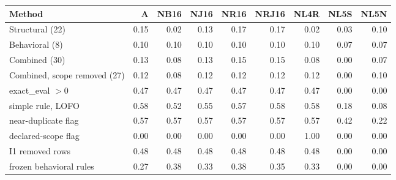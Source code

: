 \begin{tabular}{lrrrrrrrr}\toprule
Method & A & NB16 & NJ16 & NR16 & NRJ16 & NL4R & NL5S & NL5N\\\midrule
Structural (22) & 0.15 & 0.02 & 0.13 & 0.17 & 0.17 & 0.02 & 0.03 & 0.10\\
Behavioral (8) & 0.10 & 0.10 & 0.10 & 0.10 & 0.10 & 0.10 & 0.07 & 0.07\\
Combined (30) & 0.13 & 0.08 & 0.13 & 0.15 & 0.15 & 0.08 & 0.00 & 0.07\\
Combined, scope removed (27) & 0.12 & 0.08 & 0.12 & 0.12 & 0.12 & 0.12 & 0.00 & 0.10\\
exact\_eval $>0$ & 0.47 & 0.47 & 0.47 & 0.47 & 0.47 & 0.47 & 0.00 & 0.00\\
simple rule, LOFO & 0.58 & 0.52 & 0.55 & 0.57 & 0.58 & 0.58 & 0.18 & 0.08\\
near-duplicate flag & 0.57 & 0.57 & 0.57 & 0.57 & 0.57 & 0.57 & 0.42 & 0.22\\
declared-scope flag & 0.00 & 0.00 & 0.00 & 0.00 & 0.00 & 1.00 & 0.00 & 0.00\\
I1 removed rows & 0.48 & 0.48 & 0.48 & 0.48 & 0.48 & 0.48 & 0.00 & 0.00\\
frozen behavioral rules & 0.27 & 0.38 & 0.33 & 0.38 & 0.35 & 0.33 & 0.00 & 0.00\\
\bottomrule\end{tabular}
